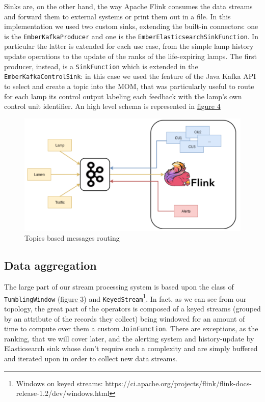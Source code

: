 Sinks are, on the other hand, the way Apache Flink consumes the data streams and forward them to external systems or print them out in a file. In this implementation we used two custom sinks, extending the built-in connectors: one is the \texttt{EmberKafkaProducer} and one is the \texttt{EmberElasticsearchSinkFunction}. In particular the latter is extended for each use case, from the simple lamp history update operations to the update of the ranks of the life-expiring lamps. The first producer, instead, is a \texttt{SinkFunction} which is extended in the \texttt{EmberKafkaControlSink}: in this case we used the feature of the Java Kafka API to select and create a topic into the MOM, that was particularly useful to route for each lamp its control output labeling each feedback with the lamp's own control unit identifier. An high level schema is represented in \hyperref[fig:ember_kafkatopology]{figure 4}

\begin{figure}[!b]
\begin{center}
	\includegraphics[scale=0.40]{img/ember_kafkatopology}
	\caption{Topics based messages routing}
	\label{fig:ember_kafkatopology}
\end{center}
\end{figure}


\subsection{Data aggregation}
The large part of our stream processing system is based upon the class of \texttt{TumblingWindow} (\hyperref[fig:flink_windows]{figure 3}) and \texttt{KeyedStream}\footnote{Windows on keyed streams: https://ci.apache.org/projects/flink/flink-docs-release-1.2/dev/windows.html}. In fact, as we can see from our topology, the great part of the operators is composed of a keyed streams (grouped by an attribute of the records they collect) being windowed for an amount of time to compute over them a custom \texttt{JoinFunction}. There are exceptions, as the ranking, that we will cover later, and the alerting system and history-update by Elasticsearch sink whose don't require such a complexity and are simply buffered and iterated upon in order to collect new data streams. 

